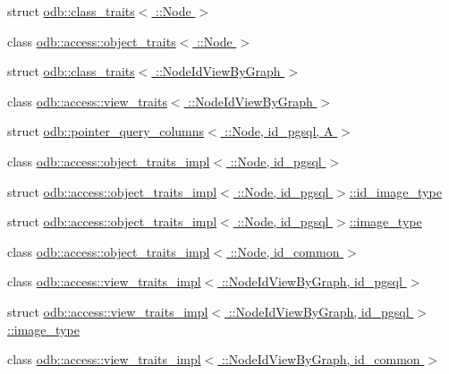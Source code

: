 \begin{DoxyCompactItemize}
\item 
struct \hyperlink{structodb_1_1class__traits_3_01_1_1_node_01_4}{odb\+::class\+\_\+traits$<$ \+::\+Node $>$}
\item 
class \hyperlink{classodb_1_1access_1_1object__traits_3_01_1_1_node_01_4}{odb\+::access\+::object\+\_\+traits$<$ \+::\+Node $>$}
\item 
struct \hyperlink{structodb_1_1class__traits_3_01_1_1_node_id_view_by_graph_01_4}{odb\+::class\+\_\+traits$<$ \+::\+Node\+Id\+View\+By\+Graph $>$}
\item 
class \hyperlink{classodb_1_1access_1_1view__traits_3_01_1_1_node_id_view_by_graph_01_4}{odb\+::access\+::view\+\_\+traits$<$ \+::\+Node\+Id\+View\+By\+Graph $>$}
\item 
struct \hyperlink{structodb_1_1pointer__query__columns_3_01_1_1_node_00_01id__pgsql_00_01_a_01_4}{odb\+::pointer\+\_\+query\+\_\+columns$<$ \+::\+Node, id\+\_\+pgsql, A $>$}
\item 
class \hyperlink{classodb_1_1access_1_1object__traits__impl_3_01_1_1_node_00_01id__pgsql_01_4}{odb\+::access\+::object\+\_\+traits\+\_\+impl$<$ \+::\+Node, id\+\_\+pgsql $>$}
\item 
struct \hyperlink{structodb_1_1access_1_1object__traits__impl_3_01_1_1_node_00_01id__pgsql_01_4_1_1id__image__type}{odb\+::access\+::object\+\_\+traits\+\_\+impl$<$ \+::\+Node, id\+\_\+pgsql $>$\+::id\+\_\+image\+\_\+type}
\item 
struct \hyperlink{structodb_1_1access_1_1object__traits__impl_3_01_1_1_node_00_01id__pgsql_01_4_1_1image__type}{odb\+::access\+::object\+\_\+traits\+\_\+impl$<$ \+::\+Node, id\+\_\+pgsql $>$\+::image\+\_\+type}
\item 
class \hyperlink{classodb_1_1access_1_1object__traits__impl_3_01_1_1_node_00_01id__common_01_4}{odb\+::access\+::object\+\_\+traits\+\_\+impl$<$ \+::\+Node, id\+\_\+common $>$}
\item 
class \hyperlink{classodb_1_1access_1_1view__traits__impl_3_01_1_1_node_id_view_by_graph_00_01id__pgsql_01_4}{odb\+::access\+::view\+\_\+traits\+\_\+impl$<$ \+::\+Node\+Id\+View\+By\+Graph, id\+\_\+pgsql $>$}
\item 
struct \hyperlink{structodb_1_1access_1_1view__traits__impl_3_01_1_1_node_id_view_by_graph_00_01id__pgsql_01_4_1_1image__type}{odb\+::access\+::view\+\_\+traits\+\_\+impl$<$ \+::\+Node\+Id\+View\+By\+Graph, id\+\_\+pgsql $>$\+::image\+\_\+type}
\item 
class \hyperlink{classodb_1_1access_1_1view__traits__impl_3_01_1_1_node_id_view_by_graph_00_01id__common_01_4}{odb\+::access\+::view\+\_\+traits\+\_\+impl$<$ \+::\+Node\+Id\+View\+By\+Graph, id\+\_\+common $>$}

\end{DoxyCompactItemize}
